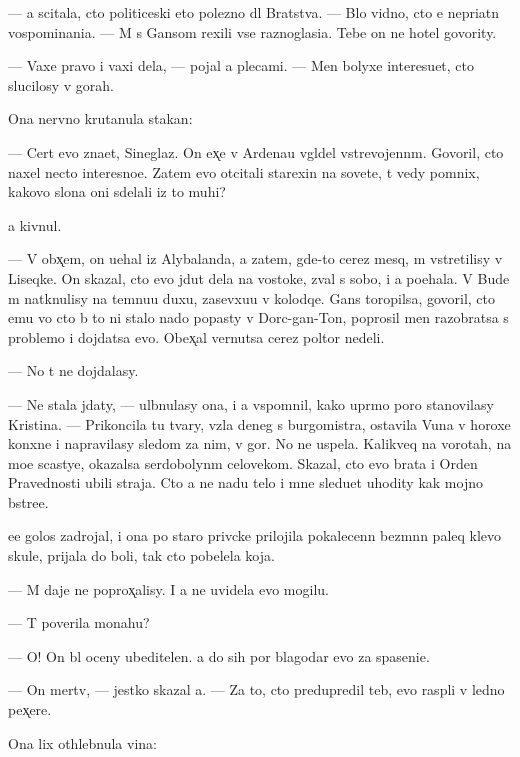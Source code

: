 \documentclass[10pt]{book}
\begin{document}
— {\Y}a scitala, cto politiceski eto polezno dl{\ia} Bratstva. — B{\yi}lo vidno, cto {\y}e{\y} nepri{\y}atn{\yi} vospominani{\y}a. — M{\yi} s Gansom rexili vse raznoglasi{\y}a. Tebe on ne hotel govority.

— Vaxe pravo i vaxi dela, — pojal {\y}a plecami. — Men{\ia} bolyxe interesu{\y}et, cto slucilosy v gorah.

Ona nervno krutanula stakan:

— Cert {\y}evo zna{\y}et, Sineglaz{\yi}{\y}. On {\y}ex̨e v Ardenau v{\yi}gl{\ia}del vstrevojenn{\yi}m. Govoril, cto naxel necto interesno{\y}e. Zatem {\y}evo otcitali stare{\y}xin{\yi} na sovete, t{\yi} vedy pomnix, kakovo slona oni sdelali iz to{\y} muhi?

{\Y}a kivnul.

— V obx̨em, on u{\y}ehal iz Alybalanda, a zatem, gde-to cerez mes{\ia}q, m{\yi} vstretilisy v Liseqke. On skazal, cto {\y}evo jdut dela na vostoke, zval s sobo{\y}, i {\y}a po{\y}ehala. V Bude m{\yi} natknulisy na temnu{\y}u duxu, zasevxu{\y}u v kolodqe. Gans toropilsa, govoril, cto {\y}emu vo cto b{\yi} to ni stalo nado popasty v Dorc-gan-To{\y}n, poprosil men{\ia} razobratsa s problemo{\y} i dojdatsa {\y}evo. Obex̨al vernutsa cerez poltor{\yi} nedeli.

— No t{\yi} ne dojdalasy.

— Ne stala jdaty, — ul{\yi}bnulasy ona, i {\y}a vspomnil, kako{\y} upr{\ia}mo{\y} poro{\y} stanovilasy Kristina. — Prikoncila tu tvary, vz{\ia}la deneg s burgomistra, ostavila V{\y}una v horoxe{\y} kon{\iu}xne i napravilasy sledom za nim, v gor{\yi}. No ne uspela. Kalikveq na vorotah, na mo{\y}e scastye, okazalsa serdobolyn{\yi}m celovekom. Skazal, cto {\y}evo brat{\y}a i Orden Pravednosti ubili straja. Cto {\y}a ne na{\y}du telo i mne sledu{\y}et uhodity kak mojno b{\yi}stre{\y}e.

{\Y}ee golos zadrojal, i ona po staro{\y} priv{\yi}cke prilojila pokalecenn{\yi}{\y} bez{\yi}m{\ia}nn{\yi}{\y} paleq klevo{\y} skule, prijala do boli, tak cto pobelela koja.

— M{\yi} daje ne poprox̨alisy. I {\y}a ne uvidela {\y}evo mogilu.

— T{\yi} poverila monahu?

— O! On b{\yi}l oceny ubeditelen. {\Y}a do sih por blagodar{\iu} {\y}evo za spaseni{\y}e.

— On mertv, — jestko skazal {\y}a. — Za to, cto predupredil teb{\ia}, {\y}evo rasp{\ia}li v led{\ia}no{\y} pex̨ere.

Ona lix othlebnula vina:
\end{document}
